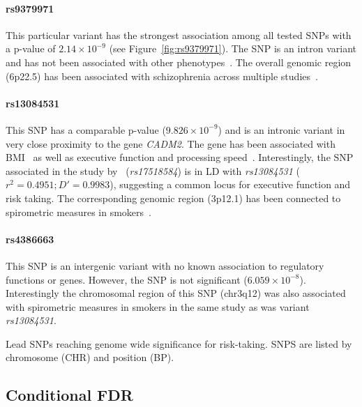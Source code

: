 \paragraph{rs9379971}
\label{par:rs9379971}
This particular variant has the strongest association among all tested SNPs with a p-value of $2.14\times10^{-9}$ (see Figure~\ref{fig:rs9379971}). 
The SNP is an intron variant and has not been associated with other phenotypes~\cite{Welter2014}.
The overall genomic region (6p22.5) has been associated with schizophrenia across multiple studies~\cite{Aberg2013,Shi2009}.

\paragraph{rs13084531}
\label{par:rs13084531}
This SNP has a comparable p-value ($9.826\times10^{-9}$) and is an intronic variant in very close proximity to the gene \textit{CADM2}.
The gene has been associated with BMI~\cite{Speliotes2010} as well as executive function and processing speed~\cite{Ibrahim-Verbaas2015}.
Interestingly, the SNP associated in the study by~\cite{Ibrahim-Verbaas2015} (\textit{rs17518584}) is in LD with \textit{rs13084531} ($r^2=0.4951;D'=0.9983$), suggesting a common locus for executive function and risk taking.
The corresponding genomic region (3p12.1) has been connected to spirometric measures in smokers~\cite{Lutz2015}.

\paragraph{rs4386663}
\label{par:rs4386663}
This SNP is an intergenic variant with no known association to regulatory functions or genes.
However, the SNP is not significant ($6.059\times10^{-8}$).
Interestingly the chromosomal region of this SNP (chr3q12) was also associated with spirometric measures in smokers in the same study as was variant \textit{rs13084531}.

\begin{table}
	\small
	\centering
	
  \caption{
    Lead SNPs reaching genome wide significance for risk-taking.
    SNPS are listed by chromosome (CHR) and position (BP).
  }\label{tab:lead_snps_risk}
\end{table}

\subsection{Conditional FDR}
\label{sub:conditional_fdr}

